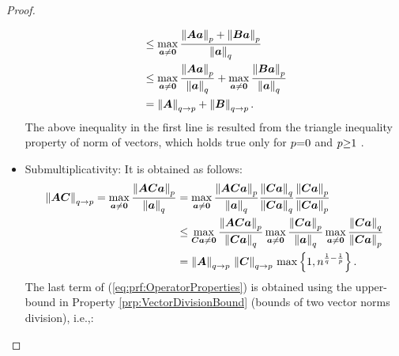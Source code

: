 \begin{proof}
\begin{itemize}
\begin{gather*}
\begin{aligned}
&\leq \max_{\boldsymbol{a} \neq \boldsymbol{0}} \frac{\left\lVert\boldsymbol{A} \boldsymbol{a}\right\rVert_{p} + \left\lVert\boldsymbol{B} \boldsymbol{a}\right\rVert_{p}}{\left\lVert\boldsymbol{a}\right\rVert_{q}} \\
&\leq \max_{\boldsymbol{a} \neq \boldsymbol{0}} \frac{\left\lVert\boldsymbol{A} \boldsymbol{a}\right\rVert_{p}}{\left\lVert\boldsymbol{a}\right\rVert_{q}} + \max_{\boldsymbol{a} \neq \boldsymbol{0}} \frac{\left\lVert\boldsymbol{B} \boldsymbol{a}\right\rVert_{p}}{\left\lVert\boldsymbol{a}\right\rVert_{q}} \\
&= \left\lVert\boldsymbol{A}\right\rVert_{q \to p} + \left\lVert\boldsymbol{B}\right\rVert_{q \to p}.
\end{aligned}
\end{gather*}
The above inequality in the first line is resulted from the triangle inequality property of norm of vectors, which holds true only for $p {=} 0$ and $p {\geq} 1$ \cite{Elad2010,Golub2013}.
\item Submultiplicativity: It is obtained as follows: %
\begin{gather}
\begin{aligned}
\label{eq:prf:OperatorProperties} 
\left\lVert\boldsymbol{A} \boldsymbol{C}\right\rVert_{q \to p} = 
\max_{\boldsymbol{a} \neq \boldsymbol{0}} \frac{\left\lVert\boldsymbol{A} \boldsymbol{C} \boldsymbol{a}\right\rVert_{p}}{\left\lVert\boldsymbol{a}\right\rVert_{q}} &=
\max_{\boldsymbol{a} \neq \boldsymbol{0}} \frac{\left\lVert\boldsymbol{A} \boldsymbol{C} \boldsymbol{a}\right\rVert_{p}}{\left\lVert\boldsymbol{a}\right\rVert_{q}} \frac{\left\lVert\boldsymbol{C} \boldsymbol{a}\right\rVert_{q}}{\left\lVert\boldsymbol{C} \boldsymbol{a}\right\rVert_{q}} \frac{\left\lVert\boldsymbol{C} \boldsymbol{a}\right\rVert_{p}}{\left\lVert\boldsymbol{C} \boldsymbol{a}\right\rVert_{p}} \\
&\leq \max_{\boldsymbol{C} \boldsymbol{a} \neq \boldsymbol{0}} \frac{\left\lVert\boldsymbol{A} \boldsymbol{C} \boldsymbol{a}\right\rVert_{p}}{\left\lVert\boldsymbol{C} \boldsymbol{a}\right\rVert_{q}}
\max_{\boldsymbol{a} \neq \boldsymbol{0}} \frac{\left\lVert\boldsymbol{C} \boldsymbol{a}\right\rVert_{p}}{\left\lVert\boldsymbol{a}\right\rVert_{q}}
\max_{\boldsymbol{a} \neq \boldsymbol{0}} \frac{\left\lVert\boldsymbol{C} \boldsymbol{a}\right\rVert_{q}}{\left\lVert\boldsymbol{C} \boldsymbol{a}\right\rVert_{p}} \\
&= \left\lVert\boldsymbol{A}\right\rVert_{q \to p} \, \left\lVert\boldsymbol{C}\right\rVert_{q \to p} \, \max \left\lbrace 1 , n^{\frac1q - \frac1p} \right\rbrace.
\end{aligned}
\end{gather}
The last term of (\ref{eq:prf:OperatorProperties}) is obtained using the upper-bound in Property \ref{prp:VectorDivisionBound} (bounds of two vector norms division), i.e.,:

\end{itemize}
\end{proof}
